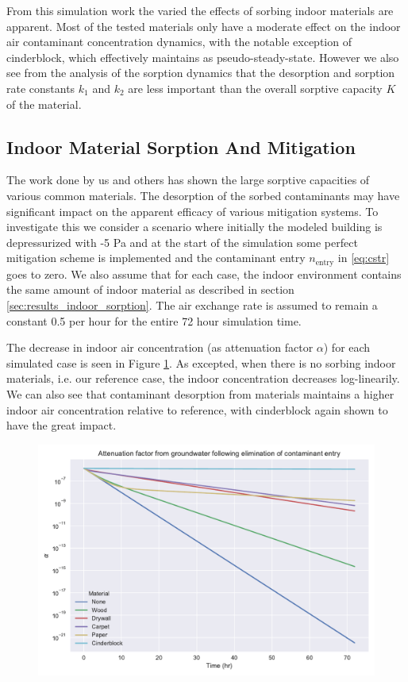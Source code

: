 From this simulation work the varied the effects of sorbing indoor materials are apparent.
Most of the tested materials only have a moderate effect on the indoor air contaminant concentration dynamics, with the notable exception of cinderblock, which effectively maintains as pseudo-steady-state.
However we also see from the analysis of the sorption dynamics that the desorption and sorption rate constants $k_1$ and $k_2$ are less important than the overall sorptive capacity $K$ of the material.\par

\subsection{Indoor Material Sorption And Mitigation}\label{sec:results_indoor_mitigation}

The work done by us and others has shown the large sorptive capacities of various common materials.
The desorption of the sorbed contaminants may have significant impact on the apparent efficacy of various mitigation systems.
To investigate this we consider a scenario where initially the modeled building is depressurized with -5 Pa and at the start of the simulation some perfect mitigation scheme is implemented and the contaminant entry $n_\mathrm{entry}$ in \eqref{eq:cstr} goes to zero.
We also assume that for each case, the indoor environment contains the same amount of indoor material as described in section \ref{sec:results_indoor_sorption}.
The air exchange rate is assumed to remain a constant 0.5 per hour for the entire 72 hour simulation time.\par %

The decrease in indoor air concentration (as attenuation factor $\alpha$) for each simulated case is seen in Figure \ref{fig:sorption_mitigation}.
As excepted, when there is no sorbing indoor materials, i.e. our reference case, the indoor concentration decreases log-linearily.
We can also see that contaminant desorption from materials maintains a higher indoor air concentration relative to reference, with cinderblock again shown to have the great impact.\par

\begin{figure}[!htb]
  \includegraphics[width=\textwidth]{sorption_mitigation.pdf}
  \caption{}
  \label{fig:sorption_mitigation}
\end{figure}
